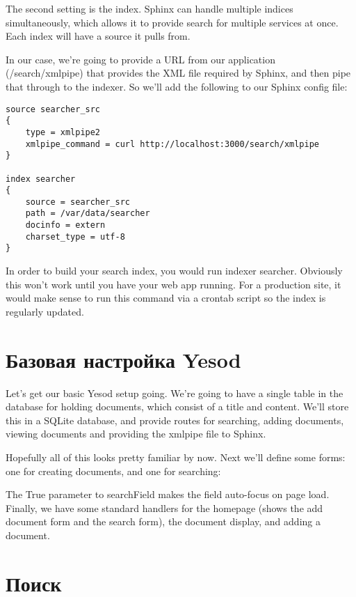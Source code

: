 The second setting is the index. Sphinx can handle multiple indices simultaneously, which allows it to provide search for multiple services at once. Each index will have a source it pulls from.

In our case, we're going to provide a URL from our application (/search/xmlpipe) that provides the XML file required by Sphinx, and then pipe that through to the indexer. So we'll add the following to our Sphinx config file:

\begin{lstlisting}
source searcher_src
{
    type = xmlpipe2
    xmlpipe_command = curl http://localhost:3000/search/xmlpipe
}

index searcher
{
    source = searcher_src
    path = /var/data/searcher
    docinfo = extern
    charset_type = utf-8
}
\end{lstlisting}

In order to build your search index, you would run indexer searcher. Obviously this won't work until you have your web app running. For a production site, it would make sense to run this command via a crontab script so the index is regularly updated.

\section{Базовая настройка Yesod} %

Let's get our basic Yesod setup going. We're going to have a single table in the database for holding documents, which consist of a title and content. We'll store this in a SQLite database, and provide routes for searching, adding documents, viewing documents and providing the xmlpipe file to Sphinx.



Hopefully all of this looks pretty familiar by now. Next we'll define some forms: one for creating documents, and one for searching:



The True parameter to searchField makes the field auto-focus on page load. Finally, we have some standard handlers for the homepage (shows the add document form and the search form), the document display, and adding a document.



\section{Поиск} %

